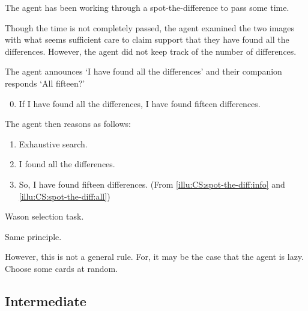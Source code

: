 \begin{note}
  \begin{illustration}
    \label{illu:CS:spot-the-diff}
    The agent has been working through a spot-the-difference to pass some time.

    Though the time is not completely passed, the agent examined the two images with what seems sufficient care to claim support that they have found all the differences.
    However, the agent did not keep track of the number of differences.

    The agent announces `I have found all the differences' and their companion responds `All fifteen?'

    \begin{enumerate}[label=\arabic*., ref=(I\ref{illu:CS:spot-the-diff}.\arabic*)]
      \setcounter{enumi}{-1}
    \item
      \label{illu:CS:spot-the-diff:info}
      If I have found all the differences, I have found fifteen differences.
    \end{enumerate}

    The agent then reasons as follows:

    \begin{enumerate}[label=\arabic*., ref=(I\ref{illu:CS:spot-the-diff}.\arabic*), resume]
    \item Exhaustive search.
    \item
      \label{illu:CS:spot-the-diff:all}
      I found all the differences.
    \item
      \label{illu:CS:spot-the-diff:fif}
      So, I have found fifteen differences. \hfill (From \ref{illu:CS:spot-the-diff:info} and \ref{illu:CS:spot-the-diff:all})
    \end{enumerate}
  \end{illustration}
\end{note}

\begin{note}
  Wason selection task.

  Same principle.

  However, this is not a general rule.
  For, it may be the case that the agent is lazy.
  Choose some cards at random.
\end{note}

\subsection{Intermediate}
\label{sec:intermediate}

